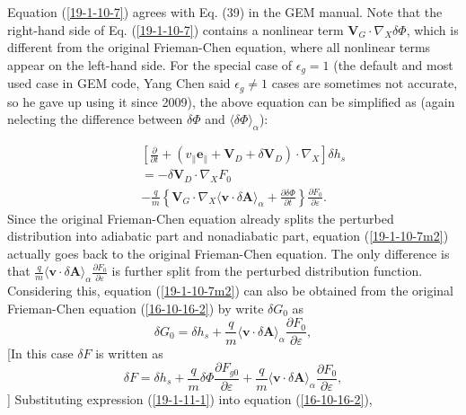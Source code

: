 \documentclass{article}
\begin{document}
Equation (\ref{19-1-10-7}) agrees with Eq. (39) in the GEM manual. Note that
the right-hand side of Eq. (\ref{19-1-10-7}) contains a nonlinear term
$\mathbf{V}_G \cdot \nabla_X \delta \Phi$, which is different from the
original Frieman-Chen equation, where all nonlinear terms appear on the
left-hand side. For the special case of $\epsilon_g = 1$ (the default and most
used case in GEM code, Yang Chen said $\epsilon_g \neq 1$ cases are sometimes
not accurate, so he gave up using it since 2009), the above equation can be
simplified as (again nelecting the difference between $\delta \Phi$ and
$\langle \delta \Phi \rangle_{\alpha}$):


\begin{eqnarray}
  &  & \left[ \frac{\partial}{\partial t} + (v_{\parallel}
  \mathbf{e}_{\parallel} +\mathbf{V}_D + \delta \mathbf{V}_D) \cdot \nabla_X
  \right] \delta h_s \nonumber\\
  &  & = - \delta \mathbf{V}_D \cdot \nabla_X F_0 \nonumber\\
  &  & - \frac{q}{m} \left\{ \mathbf{V}_G \cdot \nabla_X \langle \mathbf{v}
  \cdot \delta \mathbf{A} \rangle_{\alpha} + \frac{\partial \delta
  \Phi}{\partial t} \right\} \frac{\partial F_0}{\partial \varepsilon} . 
  \label{19-1-10-7m2}
\end{eqnarray}
Since the original Frieman-Chen equation already splits the perturbed
distribution into adiabatic part and nonadiabatic part, equation
(\ref{19-1-10-7m2}) actually goes back to the original Frieman-Chen equation.
The only difference is that $\frac{q}{m} \langle \mathbf{v} \cdot \delta
\mathbf{A} \rangle_{\alpha} \frac{\partial F_0}{\partial \varepsilon}$ is
further split from the perturbed distribution function. Considering this,
equation (\ref{19-1-10-7m2}) can also be obtained from the original
Frieman-Chen equation (\ref{16-10-16-2}) by write $\delta G_0$ as
\begin{equation}
  \label{19-1-11-1} \delta G_0 = \delta h_s + \frac{q}{m} \langle \mathbf{v}
  \cdot \delta \mathbf{A} \rangle_{\alpha} \frac{\partial F_0}{\partial
  \varepsilon},
\end{equation}
[In this case $\delta F$ is written as
\begin{equation}
  \delta F = \delta h_s + \frac{q}{m} \delta \Phi \frac{\partial F_{g
  0}}{\partial \varepsilon} + \frac{q}{m} \langle \mathbf{v} \cdot \delta
  \mathbf{A} \rangle_{\alpha} \frac{\partial F_0}{\partial \varepsilon},
\end{equation}
] Substituting expression (\ref{19-1-11-1}) into equation (\ref{16-10-16-2}),
\end{document}
